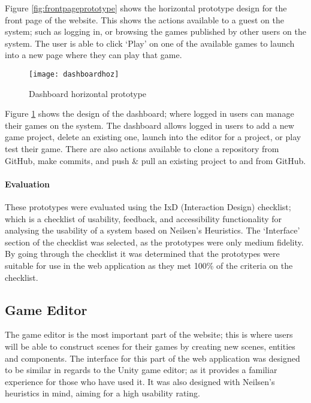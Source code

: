 	Figure \ref{fig:frontpageprototype} shows the horizontal prototype design for the front page of the website. This shows the actions available to a guest on the system; such as logging in, or browsing the games published by other users on the system. The user is able to click `Play' on one of the available games to launch into a new page where they can play that game.

	\begin{figure}[h]
		\centering
		\texttt{[image: dashboardhoz]}
		\caption{Dashboard horizontal prototype}
		\label{fig:dashboardprototype}
	\end{figure}

	Figure \ref{fig:dashboardprototype} shows the design of the dashboard; where logged in users can manage their games on the system. The dashboard allows logged in users to add a new game project, delete an existing one, launch into the editor for a project, or play test their game. There are also actions available to clone a repository from GitHub, make commits, and push \& pull an existing project to and from GitHub.

	\paragraph{Evaluation}
	These prototypes were evaluated using the IxD (Interaction Design) checklist; which is a checklist of usability, feedback, and accessibility functionality for analysing the usability of a system based on Neilsen's Heuristics. The `Interface' section of the checklist was selected, as the prototypes were only medium fidelity. By going through the checklist it was determined that the prototypes were suitable for use in the web application as they met 100\% of the criteria on the checklist.



	\subsection{Game Editor}
	The game editor is the most important part of the website; this is where users will be able to construct scenes for their games by creating new scenes, entities and components. The interface for this part of the web application was designed to be similar in regards to the Unity game editor; as it provides a familiar experience for those who have used it. It was also designed with Neilsen's heuristics in mind, aiming for a high usability rating.

